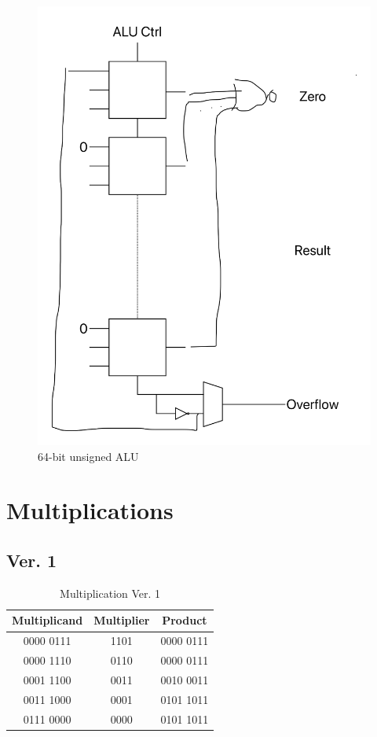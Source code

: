 \documentclass[12pt, a4paper]{article}
\begin{document}
\begin{figure}[H]
\centering
\includegraphics[width=\linewidth]{Unsigned ALU 64-bit}
\caption{64-bit unsigned ALU}
\label{fig:alu64}
\end{figure}

\section{Multiplications}

\subsection{Ver. 1}

\begin{table}[htp]
\caption{Multiplication Ver. 1}
\label{tab:multiply1}
\centering
\begin{tabular}{ccc}
\hline
Multiplicand & Multiplier & Product \\
\hline
0000 0111 & 1101 & 0000 0111 \\
0000 1110 & 0110 & 0000 0111 \\
0001 1100 & 0011 & 0010 0011 \\
0011 1000 & 0001 & 0101 1011 \\
0111 0000 & 0000 & 0101 1011 \\
\hline
\end{tabular}
\end{table}
\end{document}
